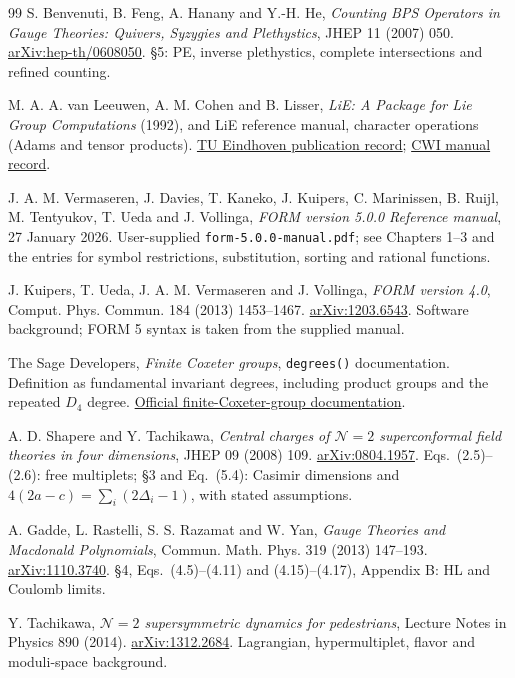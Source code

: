 \documentclass[11pt,a4paper]{article}
\numberwithin{equation}{section}
\newcommand{\code}[1]{{\small\nolinkurl{#1}}}
\begin{document}
\begin{thebibliography}{99}
 S. Benvenuti, B. Feng, A. Hanany and Y.-H. He,
\emph{Counting BPS Operators in Gauge Theories: Quivers, Syzygies and
Plethystics}, JHEP 11 (2007) 050.
\href{https://arxiv.org/abs/hep-th/0608050}{arXiv:hep-th/0608050}.
\S5: PE, inverse plethystics, complete intersections and refined counting.

 M. A. A. van Leeuwen, A. M. Cohen and B. Lisser,
\emph{LiE: A Package for Lie Group Computations} (1992), and LiE reference
manual, character operations (Adams and tensor products).
\href{https://research.tue.nl/en/publications/lie-a-package-for-lie-group-computations}{TU Eindhoven publication record};
\href{https://ir.cwi.nl/pub/29817}{CWI manual record}.

 J. A. M. Vermaseren, J. Davies, T. Kaneko, J. Kuipers,
C. Marinissen, B. Ruijl, M. Tentyukov, T. Ueda and J. Vollinga,
\emph{FORM version 5.0.0 Reference manual}, 27 January 2026.
User-supplied \code{form-5.0.0-manual.pdf}; see Chapters 1--3 and the entries
for symbol restrictions, substitution, sorting and rational functions.

 J. Kuipers, T. Ueda, J. A. M. Vermaseren and J. Vollinga,
\emph{FORM version 4.0}, Comput. Phys. Commun. 184 (2013) 1453--1467.
\href{https://arxiv.org/abs/1203.6543}{arXiv:1203.6543}.
Software background; FORM 5 syntax is taken from the supplied manual.

 The Sage Developers, \emph{Finite Coxeter groups},
\code{degrees()} documentation. Definition as fundamental invariant degrees,
including product groups and the repeated $D_4$ degree.
\href{https://doc.sagemath.org/html/en/reference/categories/sage/categories/finite_coxeter_groups.html}{Official finite-Coxeter-group documentation}.

 A. D. Shapere and Y. Tachikawa, \emph{Central charges of
$\mathcal N=2$ superconformal field theories in four dimensions},
JHEP 09 (2008) 109.
\href{https://arxiv.org/abs/0804.1957}{arXiv:0804.1957}.
Eqs.~(2.5)--(2.6): free multiplets; \S3 and Eq.~(5.4): Casimir dimensions and
$4(2a-c)=\sum_i(2\Delta_i-1)$, with stated assumptions.

 A. Gadde, L. Rastelli, S. S. Razamat and W. Yan,
\emph{Gauge Theories and Macdonald Polynomials}, Commun. Math. Phys. 319
(2013) 147--193.
\href{https://arxiv.org/abs/1110.3740}{arXiv:1110.3740}.
\S4, Eqs.~(4.5)--(4.11) and (4.15)--(4.17), Appendix B: HL and Coulomb limits.

 Y. Tachikawa, \emph{$\mathcal N=2$ supersymmetric dynamics
for pedestrians}, Lecture Notes in Physics 890 (2014).
\href{https://arxiv.org/abs/1312.2684}{arXiv:1312.2684}.
Lagrangian, hypermultiplet, flavor and moduli-space background.


\end{thebibliography}
\end{document}
